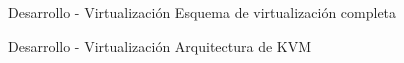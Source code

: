 \begin{frame}{Desarrollo - Virtualización}
    \vspace{0cm} {Esquema de virtualización completa}
    \vspace{0.5cm}
    \begin{figure}[ht]
       \centering
       \vspace{-0.50cm}
    \end{figure}

\end{frame}

\begin{frame}{Desarrollo - Virtualización}
    \vspace{0cm} {Arquitectura de KVM}
    \vspace{0.5cm}
    \begin{figure}[ht]
       \raggedright
       \vspace{-0.50cm}
    \end{figure}

\end{frame}


